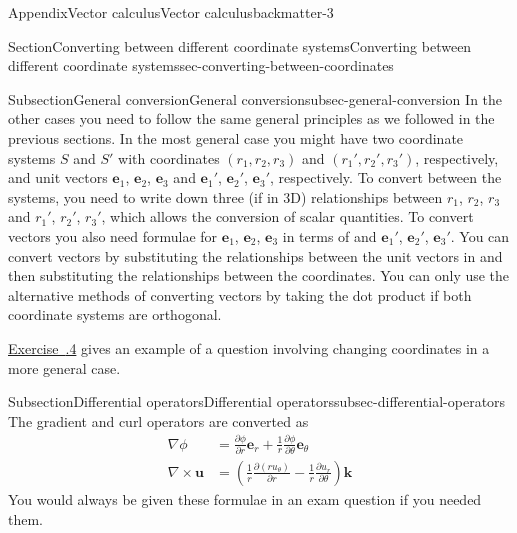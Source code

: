 \documentclass[oneside,10pt,]{book}
\newcommand{\xreffont}{\relax}
\numberwithin{equation}{section}
\newcommand{\pd}[2]{\frac{\partial#1}{\partial#2}}
\newcommand{\be}{\boldsymbol{e}}
\newcommand{\bu}{\boldsymbol{u}}
\newcommand{\bk}{\boldsymbol{k}}
\newcommand{\amp}{&}
\begin{document}
\begin{appendixptx}{Appendix}{Vector calculus}{}{Vector calculus}{}{}{backmatter-3}
\begin{sectionptx}{Section}{Converting between different coordinate systems}{}{Converting between different coordinate systems}{}{}{sec-converting-between-coordinates}
\begin{subsectionptx}{Subsection}{General conversion}{}{General conversion}{}{}{subsec-general-conversion}
In the other cases you need to follow the same general principles as we followed in the previous sections. In the most general case you might have two coordinate systems \(S\) and \(S'\) with coordinates \((r_1,r_2,r_3)\) and \((r_1',r_2',r_3')\), respectively, and unit vectors \(\be_1\), \(\be_2\), \(\be_3\) and \(\be_1'\), \(\be_2'\), \(\be_3'\), respectively. To convert between the systems, you need to write down three (if in 3D) relationships between \(r_1\), \(r_2\), \(r_3\) and \(r_1'\), \(r_2'\), \(r_3'\), which allows the conversion of scalar quantities. To convert vectors you also need formulae for \(\be_1\), \(\be_2\), \(\be_3\) in terms of and \(\be_1'\), \(\be_2'\), \(\be_3'\). You can convert vectors by substituting the relationships between the unit vectors in and then substituting the relationships between the coordinates. You can only use the alternative methods of converting vectors by taking the dot product if both coordinate systems are orthogonal.%
\par
\hyperlink{ps-stress-plate}{Exercise~{\xreffont 6.9.4}} gives an example of a question involving changing coordinates in a more general case.%
\end{subsectionptx}
%
%
\typeout{************************************************}
\typeout{************************************************}
%
\begin{subsectionptx}{Subsection}{Differential operators}{}{Differential operators}{}{}{subsec-differential-operators}
The gradient and curl operators are converted as%
\begin{align}
\nabla \phi \amp= \pd{\phi}{r}\be_r + \frac{1}{r} \pd{\phi}{\theta}\be_{\theta} \label{eqn-identity-grad-polar}\\
\nabla \times \bu \amp= \left(\frac{1}{r} \pd{(ru_\theta)}{r} - \frac{1}{r} \pd{u_r}{\theta}\right) \bk \label{eqn-identity-curlpolar}
\end{align}
You would always be given these formulae in an exam question if you needed them.%
\end{subsectionptx}
\end{sectionptx}
\end{appendixptx}
%
%
\typeout{************************************************}
\typeout{************************************************}
%
\end{document}

